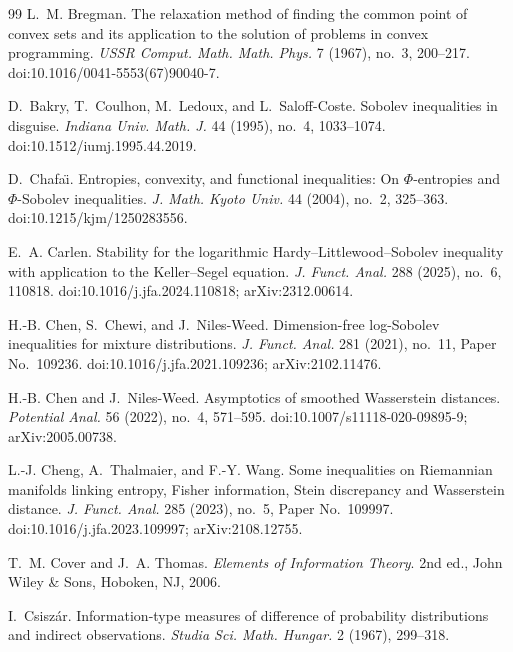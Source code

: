 \begin{thebibliography}{99}
L.~M. Bregman.
\newblock The relaxation method of finding the common point of convex sets and
its application to the solution of problems in convex programming.
\newblock \emph{USSR Comput. Math. Math. Phys.} 7 (1967), no.~3, 200--217.
\newblock doi:10.1016/0041-5553(67)90040-7.

D.~Bakry, T.~Coulhon, M.~Ledoux, and L.~Saloff-Coste.
\newblock Sobolev inequalities in disguise.
\newblock \emph{Indiana Univ. Math. J.} 44 (1995), no.~4, 1033--1074.
\newblock doi:10.1512/iumj.1995.44.2019.

D.~Chafa{\"\i}.
\newblock Entropies, convexity, and functional inequalities: On
\(\Phi\)-entropies and \(\Phi\)-Sobolev inequalities.
\newblock \emph{J. Math. Kyoto Univ.} 44 (2004), no.~2, 325--363.
\newblock doi:10.1215/kjm/1250283556.

E.~A. Carlen.
\newblock Stability for the logarithmic Hardy--Littlewood--Sobolev inequality
with application to the Keller--Segel equation.
\newblock \emph{J. Funct. Anal.} 288 (2025), no.~6, 110818.
\newblock doi:10.1016/j.jfa.2024.110818; arXiv:2312.00614.

H.-B. Chen, S.~Chewi, and J.~Niles-Weed.
\newblock Dimension-free log-Sobolev inequalities for mixture distributions.
\newblock \emph{J. Funct. Anal.} 281 (2021), no.~11, Paper No.~109236.
\newblock doi:10.1016/j.jfa.2021.109236; arXiv:2102.11476.

H.-B. Chen and J.~Niles-Weed.
\newblock Asymptotics of smoothed Wasserstein distances.
\newblock \emph{Potential Anal.} 56 (2022), no.~4, 571--595.
\newblock doi:10.1007/s11118-020-09895-9; arXiv:2005.00738.

L.-J. Cheng, A.~Thalmaier, and F.-Y. Wang.
\newblock Some inequalities on Riemannian manifolds linking entropy, Fisher
information, Stein discrepancy and Wasserstein distance.
\newblock \emph{J. Funct. Anal.} 285 (2023), no.~5, Paper No.~109997.
\newblock doi:10.1016/j.jfa.2023.109997; arXiv:2108.12755.

T.~M. Cover and J.~A. Thomas.
\newblock \emph{Elements of Information Theory}.
\newblock 2nd ed., John Wiley \& Sons, Hoboken, NJ, 2006.

I.~Csisz{\'a}r.
\newblock Information-type measures of difference of probability distributions
and indirect observations.
\newblock \emph{Studia Sci. Math. Hungar.} 2 (1967), 299--318.


\end{thebibliography}
